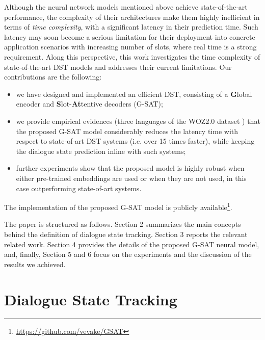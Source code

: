 \documentclass{article}
\begin{document}
Although the neural network models mentioned above achieve state-of-the-art performance, the complexity of their architectures make them highly inefficient in terms of \textit{time complexity}, with a significant latency in their prediction time. Such latency may soon become a serious limitation for their deployment into concrete application scenarios with increasing number of slots, where real time is a strong requirement. Along this perspective, this work investigates the time complexity of state-of-the-art DST models and addresses their current limitations. Our contributions are the following:
\begin{itemize}
    \item we have designed and implemented an efficient DST, consisting of a \textbf{G}lobal encoder and \textbf{S}lot-\textbf{At}tentive decoders (G-SAT);
    \item we provide empirical evidences (three languages of the WOZ2.0 dataset \cite{NBT}) that the proposed G-SAT model considerably reduces the latency time with respect to state-of-art DST systems (i.e. over 15 times faster), while keeping the dialogue state prediction inline with such systems;
    \item further experiments show that the proposed model is highly robust when either  pre-trained embeddings are used or when they are not used, in this case outperforming state-of-art systems. 
\end{itemize}

The implementation of the proposed G-SAT model is publicly available\footnote{\url{https://github.com/vevake/GSAT}}.

The paper is structured as follows. Section 2 summarizes the main concepts behind the definition of dialogue state tracking. Section 3 reports the relevant related work. Section 4 provides the details of the proposed G-SAT neural model, and, finally, Section 5 and 6 focus on the experiments and the discussion of the results we achieved.


\section{Dialogue State Tracking}
\end{document}
